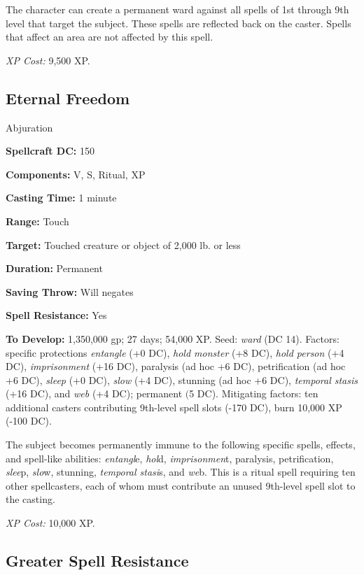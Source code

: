 \documentclass{article}
\begin{document}
The character can create a permanent ward against all spells of 1st through 9th 
level that target the subject. These spells are reflected back on the caster. Spells 
that affect an area are not affected by this spell. 

\textit{XP Cost: }9,500 XP. 

\vspace{12pt}
\subsection*{Eternal Freedom }

Abjuration 

\textbf{Spellcraft DC:} 150 

\textbf{Components:} V, S, Ritual, XP 

\textbf{Casting Time:} 1 minute 

\textbf{Range:} Touch 

\textbf{Target:} Touched creature or object of 2,000 lb. or less 

\textbf{Duration:} Permanent 

\textbf{Saving Throw:} Will negates 

\textbf{Spell Resistance:} Yes 

\textbf{To Develop:} 1,350,000 gp; 27 days; 54,000 XP. Seed: \textit{ward }(DC 
14). Factors: specific protections \textit{entangle }(+0 DC), \textit{hold monster 
}(+8 DC), \textit{hold person }(+4 DC), \textit{imprisonment }(+16 DC), paralysis 
(ad hoc +6 DC), petrification (ad hoc +6 DC), \textit{sleep }(+0 DC), \textit{slow 
}(+4 DC), stunning (ad hoc +6 DC), \textit{temporal stasis }(+16 DC), and \textit{web 
}(+4 DC); permanent $($5 DC). Mitigating factors: ten additional casters contributing 
9th-level spell slots (-170 DC), burn 10,000 XP (-100 DC). 

The subject becomes permanently immune to the following specific spells, effects, 
and spell-like abilities: \textit{entangl}e, \textit{hol}d, \textit{imprisonmen}t, 
paralysis, petrification, \textit{slee}p, \textit{slo}w, stunning, \textit{temporal 
stasi}s, and \textit{we}b. This is a ritual spell requiring ten other spellcasters, 
each of whom must contribute an unused 9th-level spell slot to the casting. 

\textit{XP Cost: }10,000 XP. 

\vspace{12pt}
\subsection*{Greater Spell Resistance }
\end{document}
